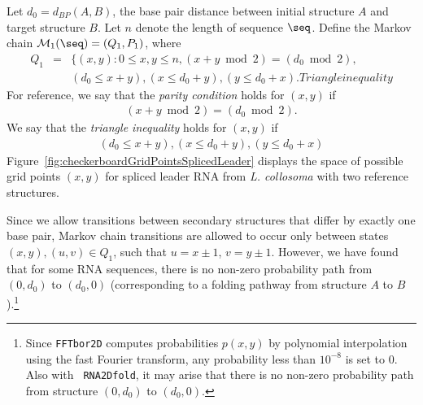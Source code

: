 \begin{description}
Let $d_0= d_{BP}(A,B)$, the base pair distance between initial structure
$A$ and target structure $B$.  Let $n$ denote the length of sequence $\seq$.
Define the Markov chain $\mathcal{M}_1(\seq) = (Q_1,P_1)$, where
\begin{eqnarray}
\label{eq:defQ1} Q_1 &=& \{ (x,y) : 0 \leq x,y \leq n, (x+y \bmod 2)
= (d_0 \bmod 2), \\ %
& & (d_0 \leq x+y), (x \leq d_0 + y), (y \leq d_0 + x). \nonumber %
Triangle inequality
\end{eqnarray}
For reference, we say that the {\em parity condition} holds for
$(x,y)$ if
\begin{eqnarray}
\label{eq:parityCondition} (x+y \bmod 2) = (d_0 \bmod 2).
\end{eqnarray}
We say that the {\em triangle inequality} holds for $(x,y)$ if
\begin{eqnarray}
\label{eq:triangleInequality} (d_0 \leq x+y), (x \leq d_0 + y), (y
\leq d_0 + x)
\end{eqnarray}
Figure~\ref{fig:checkerboardGridPointsSplicedLeader} displays the
space of possible grid points $(x,y)$ for spliced leader RNA from {\em
L. collosoma} with two reference structures.

Since we allow transitions between secondary structures that differ by
exactly one base pair, Markov chain transitions are allowed to occur
only between states $(x,y),(u,v) \in Q_1$, such that $u=x\pm 1$, $v =
y \pm 1$. However, we have found that for some RNA sequences, there is
no non-zero probability path from $(0,d_0)$ to $(d_0,0)$
(corresponding to a folding pathway from structure $A$ to
$B$).\footnote{Since {\tt FFTbor2D} computes probabilities $p(x,y)$ by
polynomial interpolation using the fast Fourier transform, any
probability less than $10^{-8}$ is set to $0$. Also with {\tt
RNA2Dfold}, it may arise that there is no non-zero probability path
from structure $(0,d_0)$ to $(d_0,0)$.}


\end{description}
